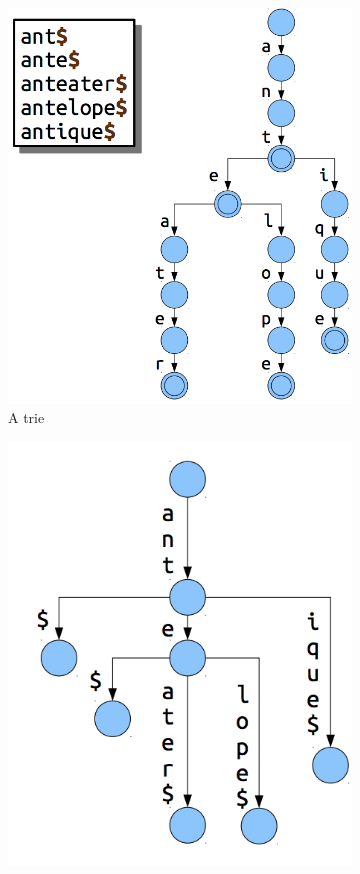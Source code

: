 \documentclass[11pt, oneside]{article}
\begin{document}
\begin{figure}[h!]
    \centering
    \begin{subfigure}[h]{0.4 \textwidth}
      \includegraphics[scale=0.25]{trie2}
      \caption{A trie}
    \end{subfigure}
    \hfill
    \begin{subfigure}[h]{0.4 \textwidth}
      \includegraphics[scale=0.25]{patricia}

\end{subfigure}
\end{figure}
\end{document}
